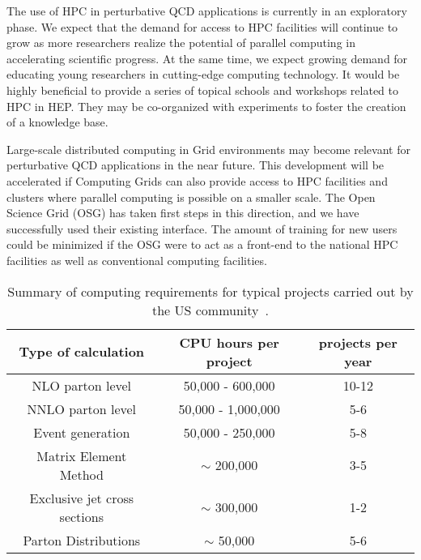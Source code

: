 The use of HPC in perturbative QCD applications is currently in
an exploratory phase. We expect that the demand for access to HPC
facilities will continue to grow as more researchers realize the 
potential of parallel computing in accelerating scientific progress. 
At the same time, we expect growing demand for educating young researchers 
in cutting-edge computing technology. It would be highly beneficial 
to provide a series of topical schools and workshops related 
to HPC in HEP. They may be co-organized with experiments to foster 
the creation of a knowledge base.

Large-scale distributed computing in Grid environments 
may become relevant for perturbative QCD applications 
in the near future. This development will be accelerated if Computing Grids
can also provide access to HPC facilities and clusters where parallel 
computing is possible on a smaller scale. The Open Science Grid (OSG)
has taken first steps in this direction, and we have successfully used their
existing interface. The amount of training for new users could be minimized
if the OSG were to act as a front-end to the national HPC facilities
as well as conventional computing facilities.

\begin{table}
  \begin{tabular}{ccc}
    \hline
    Type of calculation & CPU hours per project & projects per year \\
    \hline\hline
    NLO parton level & 50,000 - 600,000 & 10-12\\
    NNLO parton level & 50,000 - 1,000,000 & 5-6\\
    Event generation & 50,000 - 250,000 & 5-8\\
    Matrix Element Method & $\sim$ 200,000 & 3-5\\
    Exclusive jet cross sections & $\sim$ 300,000 & 1-2\\
    Parton Distributions & $\sim$ 50,000 & 5-6\\
    \hline
  \end{tabular}
  \caption{Summary of computing requirements for typical projects
    carried out by the US community~\cite{HPCWP}.
    \label{tab:summary}}
\end{table}


